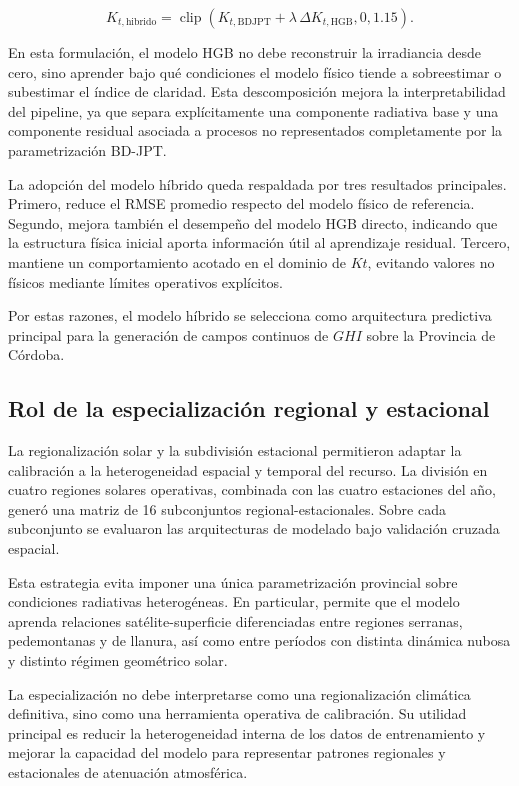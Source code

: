 \documentclass[../main.tex]{subfiles}
\begin{document}
\begin{equation}
K_{t,\mathrm{hibrido}}
=
\operatorname{clip}
\left(
K_{t,\mathrm{BDJPT}}
+
\lambda \, \Delta K_{t,\mathrm{HGB}},
0,
1.15
\right).
\label{eq:kt_hibrido_final}
\end{equation}

En esta formulación, el modelo HGB no debe reconstruir la irradiancia desde cero, sino aprender bajo qué condiciones el modelo físico tiende a sobreestimar o subestimar el índice de claridad. Esta descomposición mejora la interpretabilidad del pipeline, ya que separa explícitamente una componente radiativa base y una componente residual asociada a procesos no representados completamente por la parametrización BD-JPT.

La adopción del modelo híbrido queda respaldada por tres resultados principales. Primero, reduce el RMSE promedio respecto del modelo físico de referencia. Segundo, mejora también el desempeño del modelo HGB directo, indicando que la estructura física inicial aporta información útil al aprendizaje residual. Tercero, mantiene un comportamiento acotado en el dominio de $Kt$, evitando valores no físicos mediante límites operativos explícitos.

Por estas razones, el modelo híbrido se selecciona como arquitectura predictiva principal para la generación de campos continuos de $GHI$ sobre la Provincia de Córdoba.

\subsection{Rol de la especialización regional y estacional}

La regionalización solar y la subdivisión estacional permitieron adaptar la calibración a la heterogeneidad espacial y temporal del recurso. La división en cuatro regiones solares operativas, combinada con las cuatro estaciones del año, generó una matriz de 16 subconjuntos regional-estacionales. Sobre cada subconjunto se evaluaron las arquitecturas de modelado bajo validación cruzada espacial.

Esta estrategia evita imponer una única parametrización provincial sobre condiciones radiativas heterogéneas. En particular, permite que el modelo aprenda relaciones satélite-superficie diferenciadas entre regiones serranas, pedemontanas y de llanura, así como entre períodos con distinta dinámica nubosa y distinto régimen geométrico solar.

La especialización no debe interpretarse como una regionalización climática definitiva, sino como una herramienta operativa de calibración. Su utilidad principal es reducir la heterogeneidad interna de los datos de entrenamiento y mejorar la capacidad del modelo para representar patrones regionales y estacionales de atenuación atmosférica.
\end{document}
